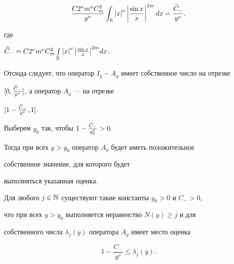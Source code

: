 \begin{pf}
\begin{multline*}
\frac{C 2^{\nu}m^{\nu}C_{m}^{2}}{y^{\nu}}


\int_{\Bbb R}\abs{x}^{\nu}\abs{\frac{\sin x}{x}}^{2 m}dx=


\frac{\tld{C}_{-}}{y^{\nu}},


\end{multline*}


где


$\tld{C}_{-}=C 2^{\nu}m^{\nu}C_{m}^{2}


\int\limits_{\Bbb R}\abs{x}^{\nu}\big|\frac{\sin x}{x}\big|^{2 m}dx$. 





Отсюда следует, что оператор $I_{y}-A_{y}$ имеет собственное число на отрезке 


$[0,\frac{\Tilde{C}_{-}}{y^{\nu}}]$, а оператор $A_{y}$ --- на отрезке 


$[1-\frac{\Tilde{C}_{-}}{y^{\nu}},1]$. 


Выберем $y_{0}$ так, чтобы $1-\frac{\Tilde{C}_{-}}{y_{0}^{\nu}}>0$. 


Тогда при всех $y>y_{0}$ оператор $A_{y}$ будет иметь положительное 


собственное значение, для которого будет 


выполняться указанная оценка.


\end{pf}








\begin{lems} \label{le:32}


Для любого $j\in\Bbb N$ существуют такие константы $y_{0}>0$ и $C_{-}>0$, 


что при всех $y>y_{0}$ выполняется неравенство $N(y)\geqslant j$ и для 


собственного числа $\lambda_{j}(y)$ оператора $A_{y}$ имеет место оценка


$$


1-\frac{C_{-}}{y^{\nu}}\leqslant\lambda_{j}(y).


$$


\end{lems}








